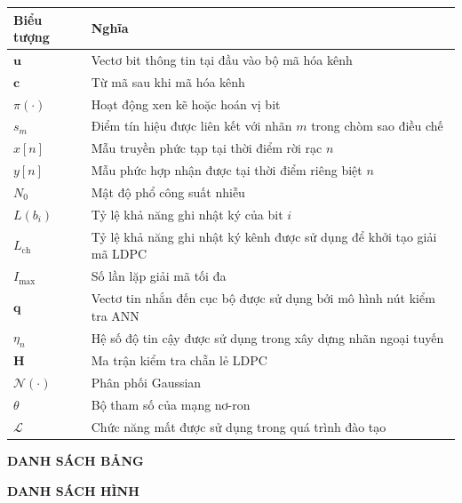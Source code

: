 \documentclass[a4paper,14pt]{extreport}
\makeatletter
\newcommand{\customlistoftables}{%
  \begin{center}
    {\bfseries DANH SÁCH BẢNG}
  \end{center}
  \vspace{0.25cm}
  \@starttoc{lot}%
}
\newcommand{\customlistoffigures}{%
  \begin{center}
    {\bfseries DANH SÁCH HÌNH}
  \end{center}
  \vspace{0.25cm}
  \@starttoc{lof}%
}
\makeatother
\begin{document}
\begin{longtable}{p{3cm}p{11cm}}
\toprule
\textbf{Biểu tượng} & \textbf{Nghĩa}\\
\midrule
$\mathbf{u}$ & Vectơ bit thông tin tại đầu vào bộ mã hóa kênh\\
$\mathbf{c}$ & Từ mã sau khi mã hóa kênh\\
$\pi(\cdot)$ & Hoạt động xen kẽ hoặc hoán vị bit\\
$s_m$ & Điểm tín hiệu được liên kết với nhãn $m$ trong chòm sao điều chế\\
$x[n]$ & Mẫu truyền phức tạp tại thời điểm rời rạc $n$\\
$y[n]$ & Mẫu phức hợp nhận được tại thời điểm riêng biệt $n$\\
$N_0$ & Mật độ phổ công suất nhiễu\\
$L(b_i)$ & Tỷ lệ khả năng ghi nhật ký của bit $i$\\
$L_{\mathrm{ch}}$ & Tỷ lệ khả năng ghi nhật ký kênh được sử dụng để khởi tạo giải mã LDPC\\
$I_{\max}$ & Số lần lặp giải mã tối đa\\
$\mathbf{q}$ & Vectơ tin nhắn đến cục bộ được sử dụng bởi mô hình nút kiểm tra ANN\\
$\eta_n$ & Hệ số độ tin cậy được sử dụng trong xây dựng nhãn ngoại tuyến\\
$\mathbf{H}$ & Ma trận kiểm tra chẵn lẻ LDPC\\
$\mathcal{N}(\cdot)$ & Phân phối Gaussian\\
$\theta$ & Bộ tham số của mạng nơ-ron\\
$\mathcal{L}$ & Chức năng mất được sử dụng trong quá trình đào tạo\\
\bottomrule
\end{longtable}

\newpage
{}
\customlistoftables

\newpage
{}
\customlistoffigures

\clearpage
{}
\setcounter{page}{1}


\end{document}

